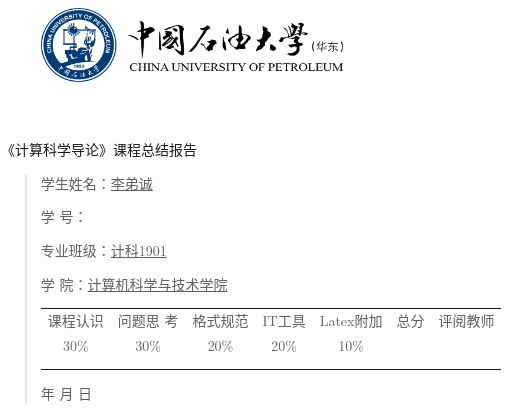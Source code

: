 \documentclass{article}
\renewcommand{\today}{\number\year 年 \number\month 月 \number\day 日}
\begin{document}
\begin{figure}
    \centering
    \includegraphics[width=8cm]{upc.png}

    \label{figupc}
\end{figure}

	\begin{center}
		\quad \\
		\quad \\
		\heiti \fontsize{45}{17} \quad \quad \quad 
		\vskip 1.5cm
		\heiti {} 《计算科学导论》课程总结报告
	\end{center}
	\vskip 2.0cm
		
	\begin{quotation}
		\doublespacing
		
        \par\setlength\parindent{7em}
		\quad 

		学生姓名：\underline{\qquad  李弟诚 \qquad \qquad}

		学\hspace{0.61cm} 号：\underline{\qquad}
		
		专业班级：\underline{\qquad 计科1901 \qquad  }
		
        学\hspace{0.61cm} 院：\underline{计算机科学与技术学院}
		\vskip 2cm
		\centering
		\begin{table}[h]
            \centering 
            \begin{tabular}{|c|c|c|c|c|c|c|}
                \hline
                课程认识 & 问题思 考 & 格式规范  & IT工具  & Latex附加  & 总分 & 评阅教师 \\
                30\% & 30\% & 20\% & 20\% & 10\% &  &  \\
                \hline
                 & & & & & &\\
                & & & & & &\\
                \hline
            \end{tabular}
        \end{table}
		\vskip 2cm
		\today
	\end{quotation}
\end{document}
